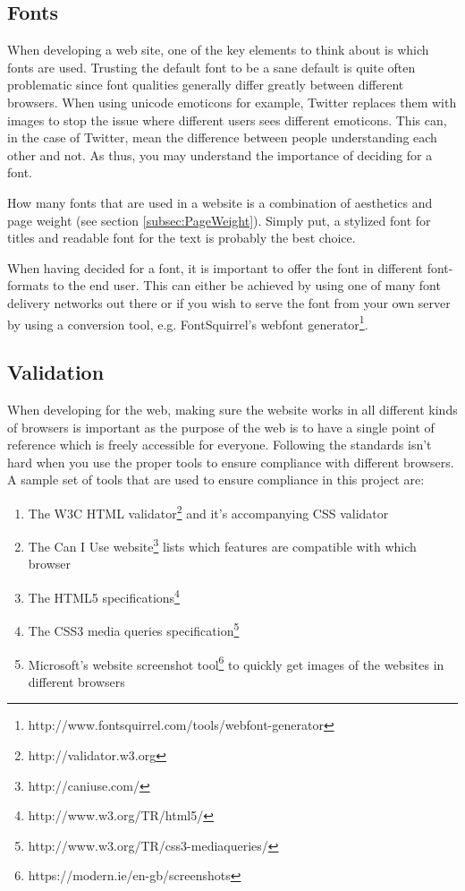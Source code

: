 \documentclass[a4paper]{scrartcl}
\begin{document}
\subsection{Fonts}
\label{subsec:Fonts}

When developing a web site, one of the key elements to think about is which fonts are used. Trusting the default font to be a sane default is quite often problematic since font qualities generally differ greatly between different browsers. When using unicode emoticons for example, Twitter replaces them with images to stop the issue where different users sees different emoticons. This can, in the case of Twitter, mean the difference between people understanding each other and not. As thus, you may understand the importance of deciding for a font.

How many fonts that are used in a website is a combination of aesthetics and page weight (see section \ref{subsec:PageWeight}). Simply put, a stylized font for titles and readable font for the text is probably the best choice.

When having decided for a font, it is important to offer the font in different font-formats to the end user. This can either be achieved by using one of many font delivery networks out there or if you wish to serve the font from your own server by using a conversion tool, e.g. FontSquirrel's webfont generator\footnote{http://www.fontsquirrel.com/tools/webfont-generator}.

\subsection{Validation}

When developing for the web, making sure the website works in all different kinds of browsers is important as the purpose of the web is to have a single point of reference which is freely accessible for everyone. Following the standards isn't hard when you use the proper tools to ensure compliance with different browsers. A sample set of tools that are used to ensure compliance in this project are:

\begin{enumerate}
\item The W3C HTML validator\footnote{http://validator.w3.org} and it's accompanying CSS validator
\item The Can I Use website\footnote{http://caniuse.com/} lists which features are compatible with which browser
\item The HTML5 specifications\footnote{http://www.w3.org/TR/html5/}
\item The CSS3 media queries specification\footnote{http://www.w3.org/TR/css3-mediaqueries/}
\item Microsoft's website screenshot tool\footnote{https://modern.ie/en-gb/screenshots} to quickly get images of the websites in different browsers
\end{enumerate}
\end{document}
